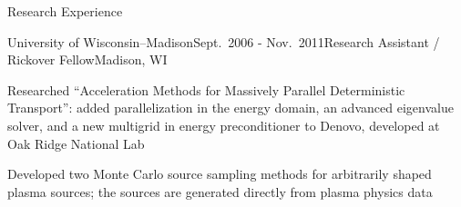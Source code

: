 \documentclass{resume3} %
\begin{document}
\begin{rSection}{Research Experience}
\begin{rSubsection}{University of Wisconsin--Madison}{Sept.\ 2006 - Nov.\ 2011}{Research Assistant / Rickover Fellow}{Madison, WI}
\item Researched “Acceleration Methods for Massively Parallel Deterministic Transport”: added parallelization in the energy domain, an advanced eigenvalue solver, and a new multigrid in energy preconditioner to Denovo, developed at Oak Ridge National Lab
\item Developed two Monte Carlo source sampling methods for arbitrarily shaped plasma sources; the sources are generated directly from plasma physics data
\end{rSubsection}








\end{rSection}
\end{document}
